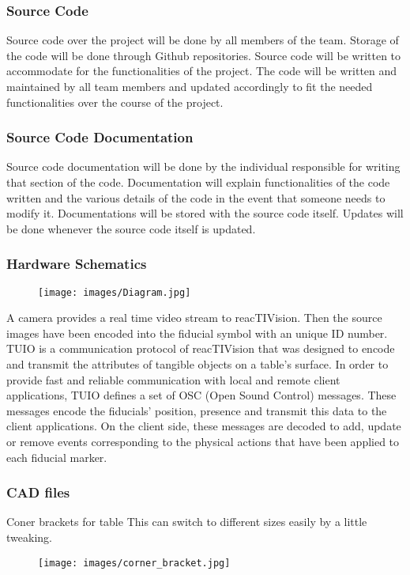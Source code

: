 \subsubsection{Source Code}
Source code over the project will be done by all members of the team. Storage of the code will be done through Github repositories. Source code will be written to accommodate for the functionalities of the project. The code will be written and maintained by all team members and updated accordingly to fit the needed functionalities over the course of the project. 

\subsubsection{Source Code Documentation}
Source code documentation will be done by the individual responsible for writing that section of the code. Documentation will explain functionalities of the code written and the various details of the code in the event that someone needs to modify it. Documentations will be stored with the source code itself. Updates will be done whenever the source code itself is updated. 

\subsubsection{Hardware Schematics}
\begin{figure}[h!]
    \centering
    \texttt{[image: images/Diagram.jpg]}
\end{figure}
A camera provides a real time video stream to reacTIVision. Then the source images have been encoded into the fiducial symbol with an unique ID number. TUIO is a communication protocol of reacTIVision that was designed to encode and transmit the attributes of tangible objects on a table's surface. In order to provide fast and reliable communication with local and remote client applications, TUIO defines a set of OSC (Open Sound Control) messages. These messages encode the fiducials' position, presence and transmit this data to the client applications. On the client side, these messages are decoded to add, update or remove events corresponding to the physical actions that have been applied to each fiducial marker.

\subsubsection{CAD files}
Coner brackets for table
    This can switch to different sizes easily by a little tweaking.
\begin{figure}[h!]
    \centering
    \texttt{[image: images/corner\_bracket.jpg]}
\end{figure}

